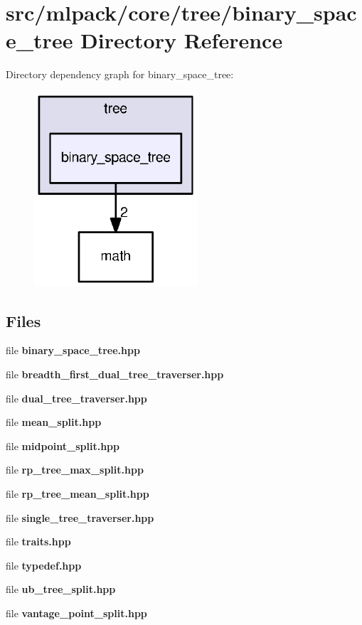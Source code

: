 \section{src/mlpack/core/tree/binary\+\_\+space\+\_\+tree Directory Reference}
\label{dir_f2c902aa2e0a74bdfe4e54224fb2267f}
Directory dependency graph for binary\+\_\+space\+\_\+tree\+:
\nopagebreak
\begin{figure}[H]
\begin{center}
\leavevmode
\includegraphics[width=172pt]{dir_f2c902aa2e0a74bdfe4e54224fb2267f_dep}
\end{center}
\end{figure}
\subsection*{Files}
\begin{DoxyCompactItemize}
\item 
file {\bf binary\+\_\+space\+\_\+tree.\+hpp}
\item 
file {\bf breadth\+\_\+first\+\_\+dual\+\_\+tree\+\_\+traverser.\+hpp}
\item 
file {\bf dual\+\_\+tree\+\_\+traverser.\+hpp}
\item 
file {\bf mean\+\_\+split.\+hpp}
\item 
file {\bf midpoint\+\_\+split.\+hpp}
\item 
file {\bf rp\+\_\+tree\+\_\+max\+\_\+split.\+hpp}
\item 
file {\bf rp\+\_\+tree\+\_\+mean\+\_\+split.\+hpp}
\item 
file {\bf single\+\_\+tree\+\_\+traverser.\+hpp}
\item 
file {\bf traits.\+hpp}
\item 
file {\bf typedef.\+hpp}
\item 
file {\bf ub\+\_\+tree\+\_\+split.\+hpp}
\item 
file {\bf vantage\+\_\+point\+\_\+split.\+hpp}
\end{DoxyCompactItemize}
